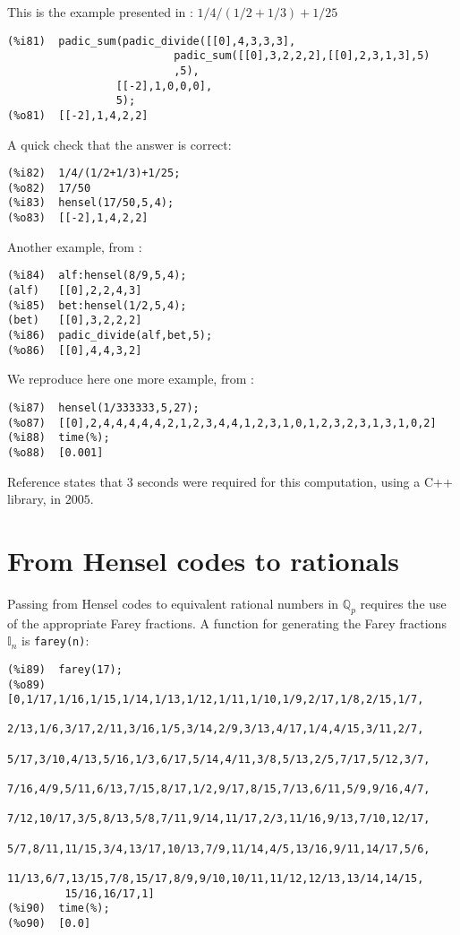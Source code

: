 \documentclass[fleqn]{cas-sc}
\begin{document}
This is the example presented in \cite{3}: $1/4/(1/2+1/3)+1/25$
\begin{verbatim}
(%i81)	padic_sum(padic_divide([[0],4,3,3,3],
                          padic_sum([[0],3,2,2,2],[[0],2,3,1,3],5)
                          ,5),
                 [[-2],1,0,0,0],
                 5);
(%o81)	[[-2],1,4,2,2]
\end{verbatim}

A quick check that the answer is correct:
\begin{verbatim}
(%i82)	1/4/(1/2+1/3)+1/25;
(%o82)	17/50
(%i83)	hensel(17/50,5,4);
(%o83)	[[-2],1,4,2,2]
\end{verbatim}

Another example, from \cite{4}:
\begin{verbatim}
(%i84)	alf:hensel(8/9,5,4);
(alf)	[[0],2,2,4,3]
(%i85)	bet:hensel(1/2,5,4);
(bet)	[[0],3,2,2,2]
(%i86)	padic_divide(alf,bet,5);
(%o86)	[[0],4,4,3,2]
\end{verbatim}

We reproduce here one more example, from \cite{6}:
\begin{verbatim}
(%i87)	hensel(1/333333,5,27);
(%o87)	[[0],2,4,4,4,4,4,2,1,2,3,4,4,1,2,3,1,0,1,2,3,2,3,1,3,1,0,2]
(%i88)	time(%);
(%o88)	[0.001]
\end{verbatim}

Reference \cite{6} states that $3$ seconds were required for this computation,
using a C++ library, in $2005$.

\section{From Hensel codes to rationals}\label{sec5}

\noindent Passing from Hensel codes to equivalent rational numbers in $\mathbb{Q}_p$
requires the use of the appropriate Farey fractions. A function for
generating the Farey fractions $\mathbb{I}_n$ is \texttt{farey(n)}:
\begin{verbatim}
(%i89)	farey(17);
(%o89)	[0,1/17,1/16,1/15,1/14,1/13,1/12,1/11,1/10,1/9,2/17,1/8,2/15,1/7,
         2/13,1/6,3/17,2/11,3/16,1/5,3/14,2/9,3/13,4/17,1/4,4/15,3/11,2/7,
         5/17,3/10,4/13,5/16,1/3,6/17,5/14,4/11,3/8,5/13,2/5,7/17,5/12,3/7,
         7/16,4/9,5/11,6/13,7/15,8/17,1/2,9/17,8/15,7/13,6/11,5/9,9/16,4/7,
         7/12,10/17,3/5,8/13,5/8,7/11,9/14,11/17,2/3,11/16,9/13,7/10,12/17,
         5/7,8/11,11/15,3/4,13/17,10/13,7/9,11/14,4/5,13/16,9/11,14/17,5/6,
         11/13,6/7,13/15,7/8,15/17,8/9,9/10,10/11,11/12,12/13,13/14,14/15,
         15/16,16/17,1]
(%i90)	time(%);
(%o90)	[0.0]
\end{verbatim}
\end{document}
